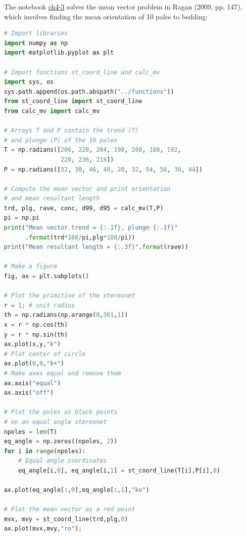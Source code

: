 \documentclass[a4paper , 12pt]{book}
\begin{document}
The notebook \href{https://github.com/nfcd/compGeo/blob/master/source/notebooks/ch4-3.ipynb}{ch4-3} solves the mean vector problem in Ragan (2009, pp. 147), which involves finding the mean orientation of 10 poles to bedding:

\begin{center}
\begin{lstlisting}[language=Python, frame=single]
# Import libraries
import numpy as np
import matplotlib.pyplot as plt

# Import functions st_coord_line and calc_mv
import sys, os
sys.path.append(os.path.abspath("../functions"))
from st_coord_line import st_coord_line
from calc_mv import calc_mv

# Arrays T and P contain the trend (T) 
# and plunge (P) of the 10 poles
T = np.radians([206, 220, 204, 198, 200, 188, 192, 
                228, 236, 218])
P = np.radians([32, 30, 46, 40, 20, 32, 54, 56, 36, 44])

# Compute the mean vector and print orientation
# and mean resultant length
trd, plg, rave, conc, d99, d95 = calc_mv(T,P)
pi = np.pi
print("Mean vector trend = {:.1f}, plunge {:.1f}"
      .format(trd*180/pi,plg*180/pi))
print("Mean resultant length = {:.3f}".format(rave))

# Make a figure
fig, ax = plt.subplots()

# Plot the primitive of the stereonet
r = 1; # unit radius
th = np.radians(np.arange(0,361,1))
x = r * np.cos(th)
y = r * np.sin(th)
ax.plot(x,y,"k")
# Plot center of circle
ax.plot(0,0,"k+")
# Make axes equal and remove them
ax.axis("equal")
ax.axis("off")

# Plot the poles as black points
# on an equal angle stereonet
npoles = len(T)
eq_angle = np.zeros((npoles, 2))
for i in range(npoles):
    # Equal angle coordinates
    eq_angle[i,0], eq_angle[i,1] = st_coord_line(T[i],P[i],0)

ax.plot(eq_angle[:,0],eq_angle[:,1],"ko")

# Plot the mean vector as a red point
mvx, mvy = st_coord_line(trd,plg,0)
ax.plot(mvx,mvy,"ro");
\end{lstlisting}
\end{center}
\end{document}
